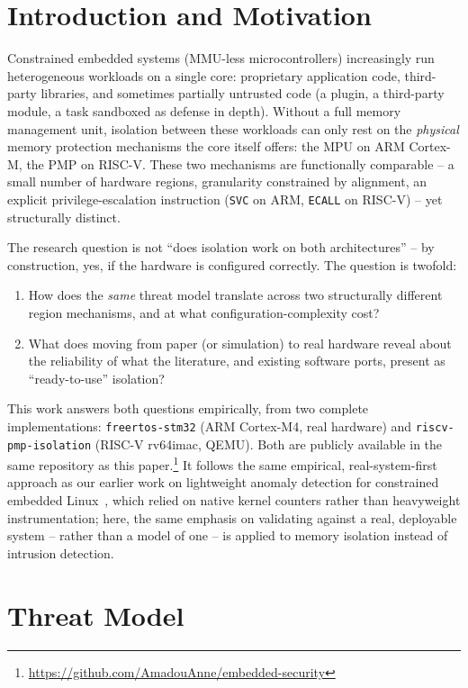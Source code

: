 \documentclass[sigconf,nonacm]{acmart}
\begin{document}
\section{Introduction and Motivation}
\label{sec:intro}

Constrained embedded systems (MMU-less microcontrollers) increasingly run heterogeneous workloads on a single core: proprietary application code, third-party libraries, and sometimes partially untrusted code (a plugin, a third-party module, a task sandboxed as defense in depth). Without a full memory management unit, isolation between these workloads can only rest on the \emph{physical} memory protection mechanisms the core itself offers: the MPU on ARM Cortex-M, the PMP on RISC-V. These two mechanisms are functionally comparable -- a small number of hardware regions, granularity constrained by alignment, an explicit privilege-escalation instruction (\texttt{SVC} on ARM, \texttt{ECALL} on RISC-V) -- yet structurally distinct.

The research question is not ``does isolation work on both architectures'' -- by construction, yes, if the hardware is configured correctly. The question is twofold:

\begin{enumerate}
  \item How does the \emph{same} threat model translate across two structurally different region mechanisms, and at what configuration-complexity cost?
  \item What does moving from paper (or simulation) to real hardware reveal about the reliability of what the literature, and existing software ports, present as ``ready-to-use'' isolation?
\end{enumerate}

This work answers both questions empirically, from two complete implementations: \texttt{freertos-stm32} (ARM Cortex-M4, real hardware) and \texttt{riscv-pmp-isolation} (RISC-V rv64imac, QEMU). Both are publicly available in the same repository as this paper.\footnote{\url{https://github.com/AmadouAnne/embedded-security}} It follows the same empirical, real-system-first approach as our earlier work on lightweight anomaly detection for constrained embedded Linux~\cite{anne2026metrics}, which relied on native kernel counters rather than heavyweight instrumentation; here, the same emphasis on validating against a real, deployable system -- rather than a model of one -- is applied to memory isolation instead of intrusion detection.

\section{Threat Model}
\label{sec:threat}
\end{document}
